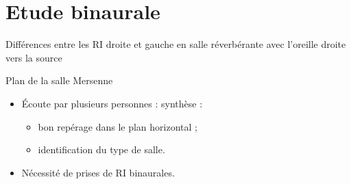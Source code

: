 \documentclass{beamer}
\begin{document}
\section{Etude binaurale}

\begin{frame}
\begin{figure}
\end{figure}
\begin{center}
Différences entre les RI droite et gauche en salle réverbérante avec l'oreille droite vers la source
\end{center}
\end{frame}

\begin{frame}
\begin{figure}
\end{figure}
\begin{center}
Plan de la salle Mersenne
\end{center}
\end{frame}

\begin{frame}
\begin{itemize}
    \item Écoute par plusieurs personnes : synthèse :
    \begin{itemize}
        \item bon repérage dans le plan horizontal ;
        \item identification du type de salle.
    \end{itemize}
    \item Nécessité de prises de RI binaurales.
\end{itemize}
 \end{frame}
\end{document}
